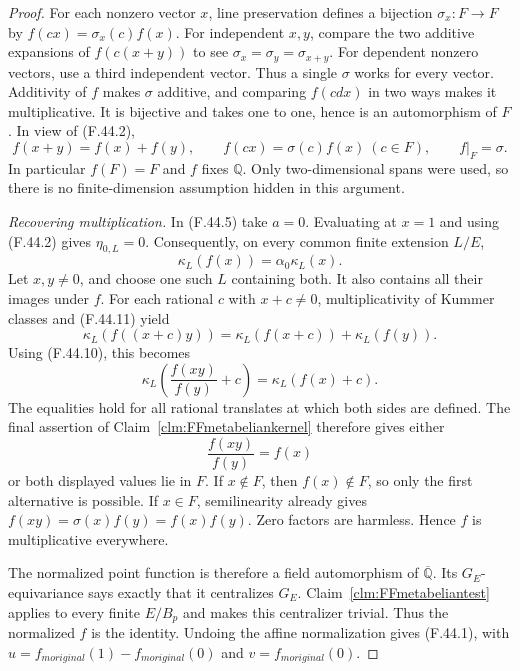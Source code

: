 \documentclass[11pt]{article}
\begin{document}
\begin{proof}
For each nonzero vector \(x\),
line preservation defines a bijection
\(\sigma_x:F\to F\) by
\(f(cx)=\sigma_x(c)f(x)\).
For independent \(x,y\), compare
the two additive expansions of
\(f(c(x+y))\) to see
\(\sigma_x=\sigma_y=\sigma_{x+y}\).
For dependent nonzero vectors,
use a third independent vector.
Thus a single \(\sigma\) works
for every vector. Additivity of
\(f\) makes \(\sigma\) additive,
and comparing \(f(cd x)\) in
two ways makes it multiplicative.
It is bijective and takes one
to one, hence is an automorphism
of \(F\). In view of (F.44.2),
\[
      f(x+y)=f(x)+f(y),\qquad
      f(cx)=\sigma(c)f(x)\ (c\in F),\qquad
      f|_F=\sigma.
                                                        \tag{F.44.10}
\]
In particular \(f(F)=F\) and
\(f\) fixes \(\mathbb Q\).
Only two-dimensional spans were
used, so there is no finite-dimension
assumption hidden in this argument.

\emph{Recovering multiplication.}
In (F.44.5) take \(a=0\).
Evaluating at \(x=1\) and using
(F.44.2) gives \(\eta_{0,L}=0\).
Consequently, on every common finite
extension \(L/E\),
\[
                            \kappa_L(f(x))
                                   =\alpha_0\kappa_L(x).
                                                        \tag{F.44.11}
\]
Let \(x,y\ne0\), and choose
one such \(L\) containing both.
It also contains all their images
under \(f\). For each rational
\(c\) with \(x+c\ne0\),
multiplicativity of Kummer classes
and (F.44.11) yield
\[
       \kappa_L(f((x+c)y))
                     =\kappa_L(f(x+c))+\kappa_L(f(y)).
\]
Using (F.44.10), this becomes
\[
       \kappa_L\!\left(\frac{f(xy)}{f(y)}+c\right)
                     =\kappa_L(f(x)+c).
                                                        \tag{F.44.12}
\]
The equalities hold for all rational
translates at which both sides
are defined. The final assertion
of Claim~\ref{clm:FFmetabeliankernel}
therefore gives either
\[
                        \frac{f(xy)}{f(y)}=f(x)
\]
or both displayed values lie in
\(F\). If \(x\notin F\),
then \(f(x)\notin F\), so
only the first alternative is
possible. If \(x\in F\),
semilinearity already gives
\(f(xy)=\sigma(x)f(y)=f(x)f(y)\).
Zero factors are harmless. Hence
\(f\) is multiplicative everywhere.

The normalized point function is
therefore a field automorphism of
\(\overline{\mathbb Q}\).
Its \(G_E\)-equivariance says exactly
that it centralizes \(G_E\).
Claim~\ref{clm:FFmetabeliantest}
applies to every finite \(E/B_p\)
and makes this centralizer trivial.
Thus the normalized \(f\) is
the identity. Undoing the affine
normalization gives (F.44.1), with
\(u=f_{
m original}(1)-f_{
m original}(0)\)
and \(v=f_{
m original}(0)\).
\end{proof}
\end{document}

